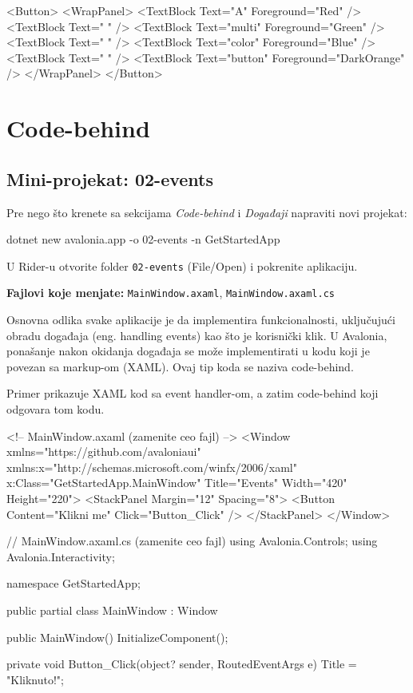\documentclass[11pt,a4paper]{article}
\begin{document}
\begin{CodeBlock}
<Button>
  <WrapPanel>
    <TextBlock Text="A" Foreground="Red" />
    <TextBlock Text=" " />
    <TextBlock Text="multi" Foreground="Green" />
    <TextBlock Text=" " />
    <TextBlock Text="color" Foreground="Blue" />
    <TextBlock Text=" " />
    <TextBlock Text="button" Foreground="DarkOrange" />
  </WrapPanel>
</Button>
\end{CodeBlock}

\section{Code-behind}

\subsection*{Mini-projekat: 02-events}
Pre nego što krenete sa sekcijama \textit{Code-behind} i \textit{Događaji} napraviti novi projekat:

\begin{CodeBlock}
dotnet new avalonia.app -o 02-events -n GetStartedApp
\end{CodeBlock}

U Rider-u otvorite folder \texttt{02-events} (File/Open) i pokrenite aplikaciju.

\textbf{Fajlovi koje menjate:} \texttt{MainWindow.axaml}, \texttt{MainWindow.axaml.cs}

Osnovna odlika svake aplikacije je da implementira funkcionalnosti, uključujući obradu događaja (eng. handling events) kao što je korisnički klik. U Avalonia, ponašanje nakon okidanja događaja se može implementirati u kodu koji je povezan sa markup-om (XAML). Ovaj tip koda se naziva code-behind.

Primer prikazuje XAML kod sa event handler-om, a zatim code-behind koji odgovara tom kodu.

\begin{CodeBlock}
<!-- MainWindow.axaml (zamenite ceo fajl) -->
<Window xmlns="https://github.com/avaloniaui"
        xmlns:x="http://schemas.microsoft.com/winfx/2006/xaml"
        x:Class="GetStartedApp.MainWindow"
        Title="Events" Width="420" Height="220">
  <StackPanel Margin="12" Spacing="8">
    <Button Content="Klikni me" Click="Button_Click" />
  </StackPanel>
</Window>
\end{CodeBlock}

\begin{CodeBlock}
// MainWindow.axaml.cs (zamenite ceo fajl)
using Avalonia.Controls;
using Avalonia.Interactivity;

namespace GetStartedApp;

public partial class MainWindow : Window
{
    public MainWindow()
    {
        InitializeComponent();
    }

    private void Button_Click(object? sender, RoutedEventArgs e)
    {
        Title = "Kliknuto!";
    }
}
\end{CodeBlock}
\end{document}
